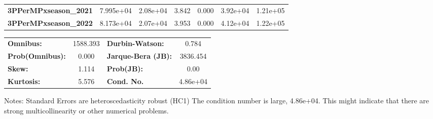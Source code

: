 \begin{center}
\begin{tabular}{lcccccc}
\textbf{3PPerMPxseason\_2021} &    7.995e+04  &     2.08e+04     &     3.842  &         0.000        &     3.92e+04    &     1.21e+05     \\
\textbf{3PPerMPxseason\_2022} &    8.173e+04  &     2.07e+04     &     3.953  &         0.000        &     4.12e+04    &     1.22e+05     \\
\bottomrule
\end{tabular}
\begin{tabular}{lclc}
\textbf{Omnibus:}       & 1588.393 & \textbf{  Durbin-Watson:     } &    0.784  \\
\textbf{Prob(Omnibus):} &   0.000  & \textbf{  Jarque-Bera (JB):  } & 3836.454  \\
\textbf{Skew:}          &   1.114  & \textbf{  Prob(JB):          } &     0.00  \\
\textbf{Kurtosis:}      &   5.576  & \textbf{  Cond. No.          } & 4.86e+04  \\
\bottomrule
\end{tabular}
\end{center}

Notes: \newline
 [1] Standard Errors are heteroscedasticity robust (HC1) \newline
 [2] The condition number is large, 4.86e+04. This might indicate that there are \newline
 strong multicollinearity or other numerical problems.